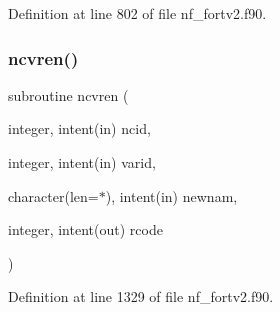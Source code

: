 Definition at line 802 of file nf\+\_\+fortv2.\+f90.

\mbox{\label{nf__fortv2_8f90_a8de81d99a1275d61dabb79e14a84c1f6}} 
\subsubsection{\texorpdfstring{ncvren()}{ncvren()}}
{\footnotesize\ttfamily subroutine ncvren (\begin{DoxyParamCaption}\item[{integer, intent(in)}]{ncid,  }\item[{integer, intent(in)}]{varid,  }\item[{character(len=$\ast$), intent(in)}]{newnam,  }\item[{integer, intent(out)}]{rcode }\end{DoxyParamCaption})}



Definition at line 1329 of file nf\+\_\+fortv2.\+f90.

